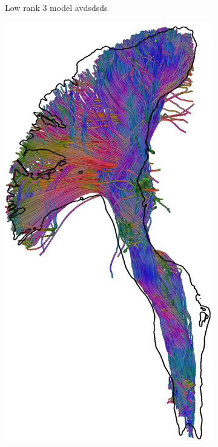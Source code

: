 \begin{figure}[t]
\begin{minipage}{0.19\linewidth}
\begin{subfigure}[b]{\linewidth}
		\caption{Low rank 3 model {\color{white} avdsdsds} }
	\end{subfigure}
	\begin{subfigure}[b]{\linewidth}
		\includegraphics[width=\linewidth]{cst-rank-bootstrap-c}

\end{subfigure}
\end{minipage}
\end{figure}
